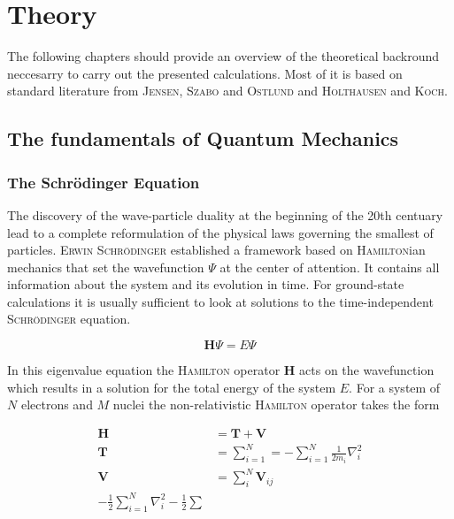 
\chapter{Theory}
\label{sec:theory}

The following chapters should provide an overview of the theoretical backround
neccesarry to carry out the presented calculations. Most of it is based on
standard literature from \textsc{Jensen}\autocite{jensen_introduction_2006}, \textsc{Szabo} and
\textsc{Ostlund}\autocite{szabo_modern_1996} and \textsc{Holthausen} and
\textsc{Koch}\autocite{koch_chemists_2001}.

\section{The fundamentals of Quantum Mechanics}
\label{sec:thefundamentalsofQM}

\subsection{The Schr\"odinger Equation}

The discovery of the wave-particle duality at the beginning of the 20th
centuary lead to a complete reformulation of the physical laws governing the
smallest of particles. \textsc{Erwin Schr\"odinger} established a framework
based on \textsc{Hamilton}ian mechanics that set the wavefunction $\Psi$ at the
center of attention. It contains all information about the system and its
evolution in time. For ground-state calculations it is usually sufficient to
look at solutions to the time-independent \textsc{Schr\"odinger} equation.

\begin{equation}
	\mathbf{H}\Psi=E\Psi
\end{equation}

In this eigenvalue equation the \textsc{Hamilton} operator $\mathbf{H}$ acts on
the wavefunction which results in a solution for the total energy of the system
$E$. For a system of $N$ electrons and $M$ nuclei the non-relativistic
\textsc{Hamilton} operator takes the form

\begin{align}
	\mathbf{H}&=\mathbf{T} + \mathbf{V} \\
	\mathbf{T}&=\sum_{i=1}^N=-\sum_{i=1}^N\frac{1}{2m_i}\nabla_i^2 \\
	\mathbf{V}&=\sum_{i}^N\mathbf{V}_{ij} \\
	-\frac{1}{2}\sum_{i=1}^N\nabla_i^2-\frac{1}{2}\sum
\end{align}
